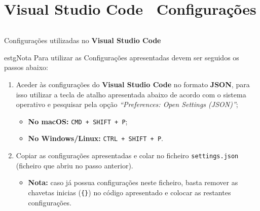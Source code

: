 \section*{\textbf{Visual Studio Code} \textemdash~Configurações}
\label{vscodeConfigs}

\begin{longlisting}
	\inputminted{json}{code/vscode-settings.json}
	\caption{Configurações utilizadas no \textbf{Visual Studio Code}}
\end{longlisting}

\begin{mybox}{estg}{Nota}
	Para utilizar as Configurações apresentadas devem ser seguidos os passos abaixo:

	\begin{enumerate}
		\item Aceder às configurações do \textbf{Visual Studio Code} no formato \textbf{JSON}, para isso utilizar a tecla de atalho apresentada abaixo de acordo com o sistema operativo e pesquisar pela opção \textit{``Preferences: Open Settings (JSON)''};
		\begin{itemize}
			\item \textbf{No macOS:} \texttt{CMD + SHIFT + P};
			\item \textbf{No Windows/Linux:} \texttt{CTRL + SHIFT + P}.
		\end{itemize}
		\item Copiar as configurações apresentadas e colar no ficheiro \texttt{settings.json} (ficheiro que abriu no passo anterior).
		\begin{itemize}
			\item \textbf{Nota:} caso já possua configurações neste ficheiro, basta remover as chavetas inicias (\verb|{}|) no código apresentado e colocar as restantes configurações.
		\end{itemize}
	\end{enumerate}
\end{mybox}